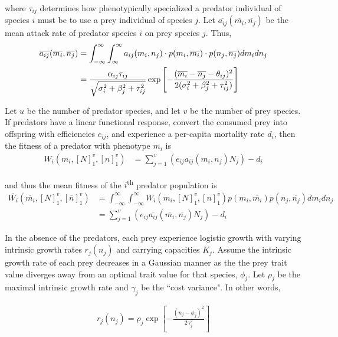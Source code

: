 \documentclass[12pt]{article}
\begin{document}
\noindent where $\tau_{ij}$ determines how phenotypically specialized a predator individual of species $i$ must be to use a prey individual of species $j$.  Let $\overline{a_{ij}}(\overline{m_i}, \overline{n_j})$ be the mean attack rate of predator species $i$ on prey species $j$.  Thus,
\begin{align*}
	\overline{a_{ij}}(\overline{m_i}, \overline{n_j}) &= \int_{-\infty}^{\infty}\int_{\-\infty}^{\infty} a_{ij}(m_i, n_j) \cdot p(m_i, \overline{m_i}) \cdot p(n_j, \overline{n_j}) dm_i dn_j \\
	&= \frac{\alpha_{ij}\tau_{ij}}{\sqrt{\sigma_i^2 + \beta_j^2 + \tau_{ij}^2}}\exp\left[{-\frac{(\overline{m_i} - \overline{n_j} - \theta_{ij})^2}{2(\sigma_i^2 + \beta_j^2 + \tau_{ij}^2)}}\right]
\end{align*}

\noindent Let $u$ be the number of predator species, and let $v$ be the number of prey species.  If predators have a linear functional response, convert the consumed prey into offspring with efficiencies $e_{ij}$, and experience a per-capita mortality rate $d_i$, then the fitness of a predator with phenotype $m_i$ is
\begin{align*}
	W_i(m_i, [N]_1^v, [n]_1^v) &= \sum_{j = 1}^v\left(e_{ij}a_{ij}(m_i, n_j)N_j\right) - d_i
\end{align*}

\noindent and thus the mean fitness of the $i$\textsuperscript{th} predator population is
\begin{align*}
	\overline{W_i}(\overline{m_i}, [N]_1^v, [\overline{n}]_1^v) &= \int_{-\infty}^{\infty}\int_{-\infty}^{\infty} W_i(m_i, [N]_1^v, [n]_1^v) p(m_i, \overline{m_i}) p(n_j, \overline{n_j}) dm_i dn_j \\
	&= \sum_{j=1}^v\left(e_{ij}\overline{a_{ij}}(\overline{m_i}, \overline{n_j})N_j\right) - d_i
\end{align*}

\noindent In the absence of the predators, each prey experience logistic growth with varying intrinsic growth rates $r_j(n_j)$ and carrying capacities $K_j$.  Assume the intrinsic growth rate of each prey decreases in a Gaussian manner as the the prey trait value diverges away from an optimal trait value for that species, $\phi_j$.  Let $\rho_j$ be the maximal intrinsic growth rate and $\gamma_j$ be the ``cost variance".  In other words,

\begin{align*}
	r_j(n_j) = \rho_j\exp{\left[-\frac{(n_j - \phi_j)^2}{2\gamma_j^2}\right]}
\end{align*}
\end{document}
